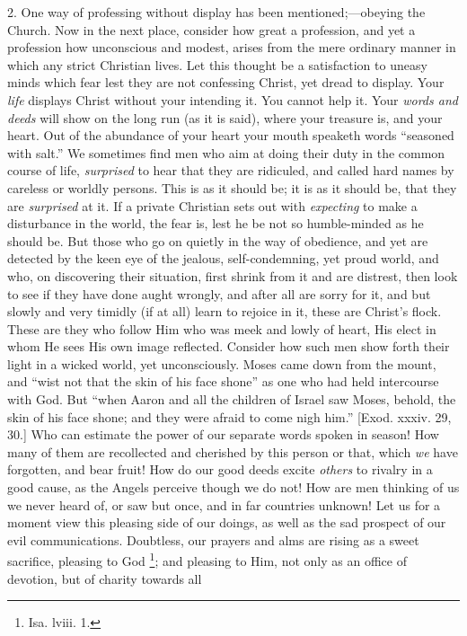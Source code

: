 2. One way of professing without display has been
mentioned;—obeying the Church. Now in the next
place, consider how great a profession, and yet a
profession how unconscious and modest, arises from the
mere ordinary manner in which any strict Christian lives.
Let this thought be a satisfaction to uneasy minds which
fear lest they are not confessing Christ, yet dread to
display. Your \emph{life} displays Christ without your
intending it. You cannot help it. Your \emph{words and deeds}
will show on the long run (as it is said), where your
treasure is, and your heart. Out of the abundance of your
heart your mouth speaketh words ``seasoned with
salt.'' We sometimes find men who aim at doing their
duty in the common course of life, \emph{surprised} to
hear that they are ridiculed, and called hard names by
careless or worldly persons. This is as it should be; it
is as it should be, that they are \emph{surprised} at it.
If a private Christian sets out with \emph{expecting} to
make a disturbance in the world, the fear is, lest he be
not so humble-minded as he should be. But those who go on
quietly in the way of obedience, and yet are detected by
the keen eye of the jealous, self-condemning, yet proud
world, and who, on discovering their situation, first
shrink from it and are distrest, then look to see if they
have done aught wrongly, and after all are sorry for it,
and but slowly and very timidly (if at all) learn to
rejoice in it, these are Christ's flock. These are they
who follow Him who was meek and lowly of heart, His elect
in whom He sees His own image reflected. Consider how
such men show forth their light in a wicked world, yet
unconsciously. Moses came down from the mount, and
``wist not that the skin of his face shone'' as
one who had held intercourse with God. But ``when
Aaron and all the children of Israel saw Moses, behold,
the skin of his face shone; and they were afraid to come
nigh him.'' [Exod. xxxiv. 29, 30.] Who can estimate
the power of our separate words spoken in season! How
many of them are recollected and cherished by this person
or that, which \emph{we} have forgotten, and bear fruit!
How do our good deeds excite \emph{others} to rivalry in
a good cause, as the Angels perceive though we do not!
How are men thinking of us we never heard of, or saw but
once, and in far countries unknown! Let us for a moment
view this pleasing side of our doings, as well as the sad
prospect of our evil communications. Doubtless, our
prayers and alms are rising as a sweet sacrifice,
pleasing to God \footnote{Isa. lviii. 1.}; and pleasing to Him, not
only as an office of devotion, but of charity towards all
